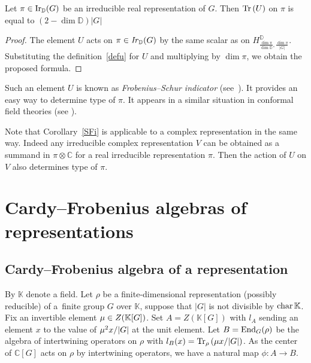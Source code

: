 \documentclass[pdftex]{sigma}
\newcommand{\tr}{\mathop{\sf tr}\nolimits}
\def \C {{\mathbb C}}
\def \tr {{\rm Tr}\,}
\def \ens {{\rm End}}
\def \F {{\mathbb K}}
\def \Mu {{\bf \mu}}
\begin{document}
\begin{corollary}[cf.~\cite{FH}]\label{SFi}
Let $\pi \in {\rm Ir}_{\mathbb D}(G)$ be an irreducible real representation of $G$. Then $\tr (U)$
on $\pi$
is equal to $(2-\dim {\mathbb D})|G|$
\end{corollary}


\begin{proof}
The element $U$ acts on $\pi \in {\it Ir}_{\mathbb D}(G)$ by the same scalar as on
$H^{\mathbb D}_{\frac{\dim\pi}{\dim {\mathbb D}},\frac{\dim\pi}{|G|}}$.
Substituting the def\/inition~\eqref{defu} for $U$
and multiplying by $\dim \pi$,
we obtain the proposed formula.
\end{proof}

Such an element $U$ is known as  {\em Frobenius--Schur indicator} (see~\cite{FH}). It provides
an easy way to determine type of $\pi$.
It appears in a similar situation in conformal f\/ield theories
(see \cite{B, FFFS}).

\begin{note}
Note that Corollary~\ref{SFi} is applicable to a complex representation in
the same way. Indeed any irreducible complex representation $V$ can be
obtained as a summand in $\pi \otimes \C$ for a real irreducible
representation $\pi$. Then the action of $U$ on $V$ also determines type of $\pi$.
\end{note}




\section[Cardy-Frobenius algebras of representations]{Cardy--Frobenius algebras of representations}\label{s4}

\subsection[Cardy-Frobenius algebra of a representation]{Cardy--Frobenius algebra of a representation}\label{s4.1}

By $\F$ denote a f\/ield.
Let $\rho$ be a f\/inite-dimensional representation (possibly reducible) of a~f\/inite group $G$ over $\F$,
suppose that $|G|$ is not divisible by ${\rm char}\, \F$. Fix an invertible element $\Mu \in  Z(\F[G])$.
Set $A = Z(\F[G])$ with $l_A$ sending an element $x$ to the value of
$\Mu^2 x/|G|$ at the unit element.
Let $B = \ens_G (\rho)$ be the
algebra of intertwining operators on $\rho$ with $l_B (x) = {\rm Tr}_\rho \left(\Mu x/|G|\right)$.
As the center of $\C[G]$ acts on $\rho$ by intertwining operators, we have a natural map $\phi: A \to B$.
\end{document}
